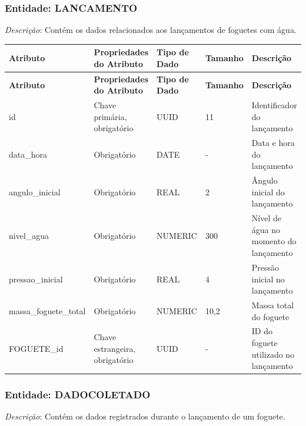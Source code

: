 \subsubsection*{Entidade: LANCAMENTO}  
\textit{Descrição}: Contém os dados relacionados aos lançamentos de foguetes com água.  

\begin{longtable}{|p{3.7cm}|p{2.7cm}|p{2cm}|p{1.8cm}|p{4cm}|}
\hline
\textbf{Atributo} & \textbf{Propriedades do Atributo} & \textbf{Tipo de Dado} & \textbf{Tamanho} & \textbf{Descrição} \\
\hline
\endfirsthead

\hline
\textbf{Atributo} & \textbf{Propriedades do Atributo} & \textbf{Tipo de Dado} & \textbf{Tamanho} & \textbf{Descrição} \\
\hline
\endhead

id & Chave primária, obrigatório & UUID & 11 & Identificador do lançamento \\
\hline
data\_hora & Obrigatório & DATE & - & Data e hora do lançamento \\
\hline
angulo\_inicial & Obrigatório & REAL & 2 & Ângulo inicial do lançamento \\
\hline
nivel\_agua & Obrigatório & NUMERIC & 300 & Nível de água no momento do lançamento \\
\hline
pressao\_inicial & Obrigatório & REAL & 4 & Pressão inicial no lançamento \\
\hline
massa\_foguete\_total & Obrigatório & NUMERIC & 10,2 & Massa total do foguete \\
\hline
FOGUETE\_id & Chave estrangeira, obrigatório & UUID & - & ID do foguete utilizado no lançamento \\
\hline
\end{longtable}

\subsubsection*{Entidade: DADOCOLETADO}  
\textit{Descrição}: Contém os dados registrados durante o lançamento de um foguete.  

